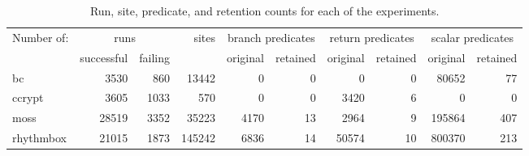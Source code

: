 \begin{table*}
\centering
\begin{tabular}{|l|r|r|r|r|r|r|r|r|r|}
\hline
Number of: & \multicolumn{2}{c|}{runs}  & sites  & 
\multicolumn{2}{c|}{branch predicates} & \multicolumn{2}{c|}{return 
predicates} & \multicolumn{2}{c|}{scalar predicates}\\ \cline{2-3} \cline{5-6} \cline{7-8} \cline{9-10}
           & successful & failing       &        & original & retained & 
original & retained & original & retained \\
\hline
\hline
bc         &  3530      &   860         &  13442 &      0 &          0 &        
0 &        0 &    80652 &       77 \\
\hline
ccrypt     &  3605      &  1033         &    570 &      0 &          0 &     
3420 &        6 &        0 &        0 \\
\hline
moss       & 28519      &  3352         &  35223 &   4170 &         13 &     
2964 &        9 &   195864 &      407 \\
\hline
rhythmbox  & 21015      &  1873         & 145242 &   6836 &         14 &    
50574 &       10 &   800370 &      213 \\
\hline
\end{tabular}
\caption{Run, site, predicate, and retention counts for each of the experiments.}
\label{tab:exps}
\end{table*}

